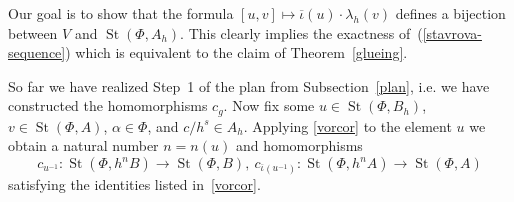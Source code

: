 \documentclass[oneside, 11pt]{amsart}
\numberwithin{equation}{section}
\newcommand{\St}{\mathop{\mathrm{St}}\nolimits}
\theoremstyle{definition}
\theoremstyle{definition}
\theoremstyle{remark}
\begin{document}
Our goal is to show that the formula $[u, v] \mapsto \overline{\iota}(u) \cdot \lambda_{h}(v)$ defines a bijection between $V$ and $\St(\Phi, A_{h})$. This clearly implies the exactness of~(\ref{stavrova-sequence}) which is equivalent to the claim of Theorem~\ref{glueing}. 

So far we have realized Step~1 of the plan from Subsection~\ref{plan}, i.e. we have constructed the homomorphisms $c_g$. Now fix some $u \in \St(\Phi, B_h)$, $v \in \St(\Phi, A)$, $\alpha \in \Phi$, and $c/{h^s} \in A_{h}$. 
Applying \cref{vorcor} to the element $u$ we obtain a natural number $n=n(u)$ and homomorphisms \begin{equation} \label{eq:c-homs} c_{u^{-1}}\colon \St(\Phi, h^nB) \to \St(\Phi, B),\ c_{\overline{\iota}(u^{-1})}\colon \St(\Phi, h^nA) \to \St(\Phi, A)\end{equation}
satisfying the identities listed in~\cref{vorcor}.
\end{document}
